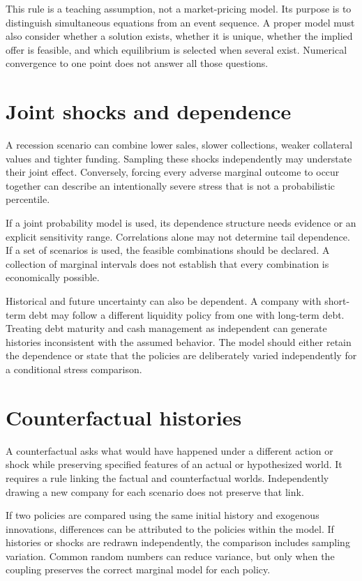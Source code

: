 This rule is a teaching assumption, not a market-pricing model. Its purpose is to distinguish simultaneous equations from an event sequence. A proper model must also consider whether a solution exists, whether it is unique, whether the implied offer is feasible, and which equilibrium is selected when several exist. Numerical convergence to one point does not answer all those questions.

\section{Joint shocks and dependence}
A recession scenario can combine lower sales, slower collections, weaker collateral values and tighter funding. Sampling these shocks independently may understate their joint effect. Conversely, forcing every adverse marginal outcome to occur together can describe an intentionally severe stress that is not a probabilistic percentile.

If a joint probability model is used, its dependence structure needs evidence or an explicit sensitivity range. Correlations alone may not determine tail dependence. If a set of scenarios is used, the feasible combinations should be declared. A collection of marginal intervals does not establish that every combination is economically possible.

Historical and future uncertainty can also be dependent. A company with short-term debt may follow a different liquidity policy from one with long-term debt. Treating debt maturity and cash management as independent can generate histories inconsistent with the assumed behavior. The model should either retain the dependence or state that the policies are deliberately varied independently for a conditional stress comparison.

\section{Counterfactual histories}
A counterfactual asks what would have happened under a different action or shock while preserving specified features of an actual or hypothesized world. It requires a rule linking the factual and counterfactual worlds. Independently drawing a new company for each scenario does not preserve that link.

If two policies are compared using the same initial history and exogenous innovations, differences can be attributed to the policies within the model. If histories or shocks are redrawn independently, the comparison includes sampling variation. Common random numbers can reduce variance, but only when the coupling preserves the correct marginal model for each policy.

